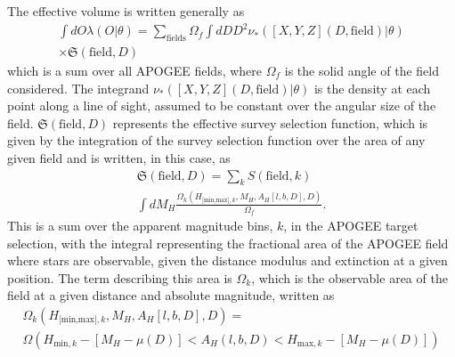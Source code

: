  The effective volume is written generally as
  \begin{multline}
 \label{eq:effvol}
 \int dO \lambda(O|\theta) = \sum_{\text{fields}} \Omega_f \int dD D^2 \nu_*([X,Y,Z](D,\text{field})|\theta)\\ \times \mathfrak{S}(\text{field},D)
 \end{multline}
 which is a sum over all APOGEE fields, where $\Omega_f$ is the solid angle of the field considered. The integrand $ \nu_*([X,Y,Z](D,\text{field})|\theta)$ is the density at each point along a line of sight, assumed to be constant over the angular size of the field. $\mathfrak{S}(\text{field},D)$ represents the effective survey selection function, which is given by the integration of the survey selection function over the area of any given field and is written, in this case, as
 \begin{multline}
 \mathfrak{S}(\text{field}, D) = \sum_k S(\text{field},k) \\ \int dM_H \frac{\Omega_k(H_{\text{[min,max]},k}, M_H, A_H[l,b,D], D)}{\Omega_f}.
 \label{eq:effsel}
 \end{multline}
 This is a sum over the apparent magnitude bins, $k$, in the APOGEE target selection, with the integral representing the fractional area of the APOGEE field where stars are observable, given the distance modulus and extinction at a given position. The term describing this area is $\Omega_k$, which is the observable area of the field at a given distance and absolute magnitude, written as
 \begin{multline}
 \Omega_k(H_{\text{[min,max]},k}, M_H, A_H[l,b,D], D) =\\ \Omega(H_{\text{min},k} - [M_H - \mu(D)] < A_H(l,b,D) < H_{\text{max},k} - [M_H - \mu(D)])
 \end{multline}

